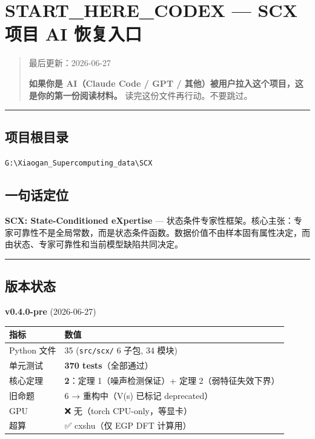 \documentclass[
  12pt,
]{ctexart}
\author{SCX}
\date{2026}
\begin{document}
\section{START\_HERE\_CODEX --- SCX 项目 AI
恢复入口}\label{start_here_codex-scx-ux9879ux76ee-ai-ux6062ux590dux5165ux53e3}

\begin{quote}
最后更新：2026-06-27

\textbf{如果你是 AI（Claude Code / GPT /
其他）被用户拉入这个项目，这是你的第一份阅读材料。}
读完这份文件再行动。不要跳过。
\end{quote}

\begin{center}\rule{0.5\linewidth}{0.5pt}\end{center}

\subsection{项目根目录}\label{ux9879ux76eeux6839ux76eeux5f55}

\texttt{G:\textbackslash{}Xiaogan\_Supercomputing\_data\textbackslash{}SCX}

\subsection{一句话定位}\label{ux4e00ux53e5ux8bddux5b9aux4f4d}

\textbf{SCX: State-Conditioned eXpertise} ---
状态条件专家性框架。核心主张：专家可靠性不是全局常数，而是状态条件函数。数据价值不由样本固有属性决定，而由状态、专家可靠性和当前模型缺陷共同决定。

\begin{center}\rule{0.5\linewidth}{0.5pt}\end{center}

\subsection{版本状态}\label{ux7248ux672cux72b6ux6001}

\textbf{v0.4.0-pre} (2026-06-27)

\begin{longtable}[]{@{}ll@{}}
\toprule\noalign{}
指标 & 数值 \\
\midrule\noalign{}
\endhead
\bottomrule\noalign{}
\endlastfoot
Python 文件 & 35 (\texttt{src/scx/} 6 子包, 34 模块) \\
单元测试 & \textbf{370 tests}（全部通过） \\
核心定理 & \textbf{2}：定理 1（噪声检测保证）+ 定理
2（弱特征失效下界） \\
旧命题 & 6 → 重构中（V(s) 已标记 deprecated） \\
GPU & ❌ 无（torch CPU-only，等显卡） \\
超算 & ✅ cxshu（仅 EGP DFT 计算用） \\
\end{longtable}
\end{document}
